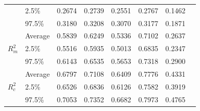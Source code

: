 \begin{table}[!ht]
\begin{tabular}{@{}llcccccc@{}}
                                           & 2.5\%   & 0.2674 & 0.2739 & 0.2551 & 0.2767 & 0.1462 \\
                                           & 97.5\%  & 0.3180 & 0.3208 & 0.3070 & 0.3177 & 0.1871 \\ \midrule
      \multirow{3}{*}{$R^2_m$}            & Average & 0.5839 & 0.6249 & 0.5336 & 0.7102 & 0.2637 \\
                                           & 2.5\%   & 0.5516 & 0.5935 & 0.5013 & 0.6835 & 0.2347 \\
                                           & 97.5\%  & 0.6143 & 0.6535 & 0.5653 & 0.7318 & 0.2900 \\ \midrule
      \multirow{3}{*}{$R^2_c$}            & Average & 0.6797 & 0.7108 & 0.6409 & 0.7776 & 0.4331 \\
                                           & 2.5\%   & 0.6526 & 0.6836 & 0.6126 & 0.7582 & 0.3919 \\
                                           & 97.5\%  & 0.7053 & 0.7352 & 0.6682 & 0.7973 & 0.4765 \\ \bottomrule
    \end{tabular}

\end{table}
